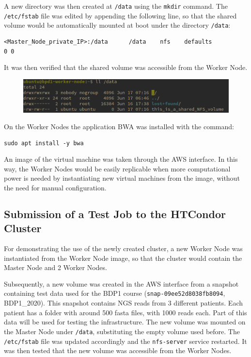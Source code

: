 \documentclass{article}
\begin{document}
A new directory was then created at \texttt{/data} using the \texttt{mkdir} command.
The \texttt{/etc/fstab} file was edited by appending the following line, so that the shared volume would be automatically mounted at boot under the directory \texttt{/data}:

\begin{lstlisting}
<Master_Node_private_IP>:/data      /data    nfs    defaults                0 0
\end{lstlisting}

It was then verified that the shared volume was accessible from the Worker Node.

\begin{figure}[!h]
    \center
    \includegraphics[width=\textwidth]{./images/nfs_works.png}
\end{figure}

On the Worker Nodes the application BWA was installed with the command:

\begin{lstlisting}
sudo apt install -y bwa
\end{lstlisting}

An image of the virtual machine was taken through the AWS interface.
In this way, the Worker Nodes would be easily replicable when more computational power is needed by instantiating new virtual machines from the image, without the need for manual configuration.

\subsection{Submission of a Test Job to the HTCondor Cluster}
For demonstrating the use of the newly created cluster, a new Worker Node was instantiated from the Worker Node image, so that the cluster would contain the Master Node and 2 Worker Nodes.

Subsequently, a new volume was created in the AWS interface from a snapshot containing test data used for the BDP1 course (\texttt{snap-09ee52d8038fb8094}, BDP1\_2020).
This snapshot contains NGS reads from 3 different patients.
Each patient has a folder with around 500 fasta files, with 1000 reads each.
Part of this data will be used for testing the infrastructure.
The new volume was mounted on the Master Node under \texttt{/data}, substituting the empty volume used before.
The \texttt{/etc/fstab} file was updated accordingly and the \texttt{nfs-server} service restarted.
It was then tested that the new volume was accessible from the Worker Nodes.
\end{document}
